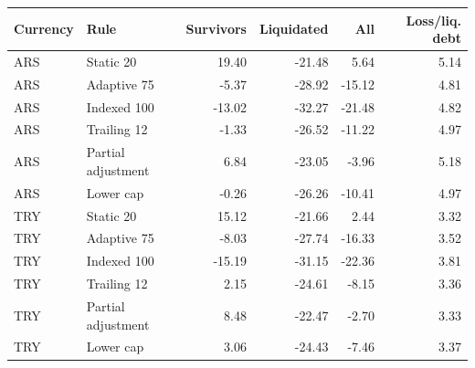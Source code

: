 \begin{tabular}{llrrrr}
\toprule
Currency & Rule & Survivors & Liquidated & All & Loss/liq. debt \\
\midrule
ARS & Static 20 & 19.40 & -21.48 & 5.64 & 5.14 \\
ARS & Adaptive 75 & -5.37 & -28.92 & -15.12 & 4.81 \\
ARS & Indexed 100 & -13.02 & -32.27 & -21.48 & 4.82 \\
ARS & Trailing 12 & -1.33 & -26.52 & -11.22 & 4.97 \\
ARS & Partial adjustment & 6.84 & -23.05 & -3.96 & 5.18 \\
ARS & Lower cap & -0.26 & -26.26 & -10.41 & 4.97 \\
TRY & Static 20 & 15.12 & -21.66 & 2.44 & 3.32 \\
TRY & Adaptive 75 & -8.03 & -27.74 & -16.33 & 3.52 \\
TRY & Indexed 100 & -15.19 & -31.15 & -22.36 & 3.81 \\
TRY & Trailing 12 & 2.15 & -24.61 & -8.15 & 3.36 \\
TRY & Partial adjustment & 8.48 & -22.47 & -2.70 & 3.33 \\
TRY & Lower cap & 3.06 & -24.43 & -7.46 & 3.37 \\
\bottomrule
\end{tabular}
